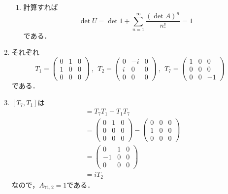 \documentclass[a4paper,pdflatex,ja=standard]{bxjsarticle}
\begin{document}
\begin{enumerate}
\begin{enumerate}
    \item 

    計算すれば
    \begin{equation}
      \det U
      =
      \det 1
      +
      \sum_{n=1}^{\infty}\frac{(\det A)^{n}}{n!}
      =
      1
    \end{equation}
    である．

  \end{enumerate}

  \item 

  それぞれ
  \begin{equation}
    T_{1}
    =
    \begin{pmatrix}
      0 & 1 & 0 \\
      1 & 0 & 0 \\
      0 & 0 & 0
    \end{pmatrix}
    \ ,\ \ 
    T_{2}
    =
    \begin{pmatrix}
      0 & -i & 0 \\
      i & 0 & 0 \\
      0 & 0 & 0
    \end{pmatrix}
    \ ,\ \ 
    T_{7}
    =
    \begin{pmatrix}
      1 & 0 & 0 \\
      0 & 0 & 0 \\
      0 & 0 & -1
    \end{pmatrix}
  \end{equation}
  である．

  \item 

  $[T_{7},T_{1}]$は
  \begin{align}
    [T_{7},T_{1}]
    &=
    T_{7}T_{1}-T_{1}T_{7}
    \nonumber
    \\
    &=
    \begin{pmatrix}
      0 & 1 & 0 \\
      0 & 0 & 0 \\
      0 & 0 & 0
    \end{pmatrix}
    -
    \begin{pmatrix}
      0 & 0 & 0 \\
      1 & 0 & 0 \\
      0 & 0 & 0
    \end{pmatrix}
    \nonumber
    \\
    &=
    \begin{pmatrix}
      0 & 1 & 0 \\
      -1 & 0 & 0 \\
      0 & 0 & 0
    \end{pmatrix}
    \nonumber
    \\
    &=
    iT_{2}
  \end{align}
  なので，$A_{71,2}=1$である．


\end{enumerate}
\end{document}
